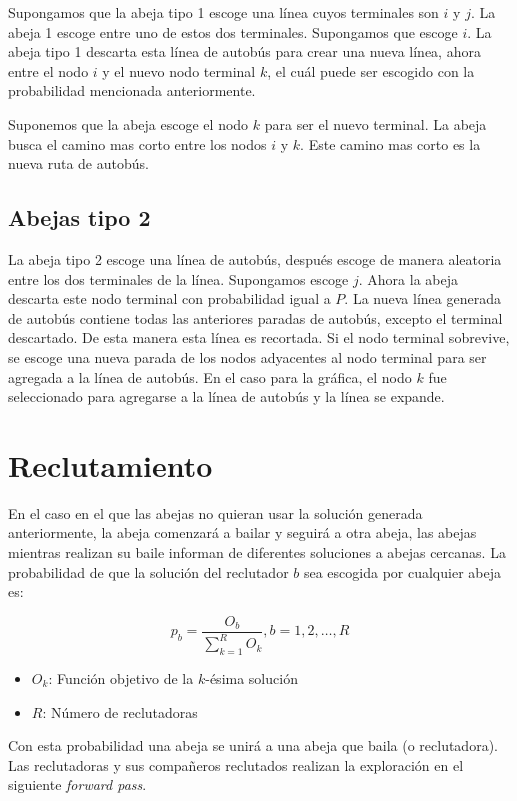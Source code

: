 \documentclass[letterpaper,12pt]{article}
\begin{document}
Supongamos que la abeja tipo 1 escoge una línea cuyos terminales son $i$ y $j$.
La abeja 1 escoge entre uno de estos dos terminales. Supongamos que escoge $i$. 
La abeja tipo 1 descarta esta línea de autobús para crear una nueva línea, 
ahora entre el nodo $i$ y el nuevo nodo terminal $k$, el cuál puede ser 
escogido con la probabilidad mencionada anteriormente.

Suponemos que la abeja escoge el nodo $k$ para ser el nuevo terminal. La abeja 
busca el camino mas corto entre los nodos $i$ y $k$. Este camino mas corto es
la nueva ruta de autobús.

\subsection{Abejas tipo 2}

La abeja tipo 2 escoge una línea de autobús, después escoge de manera 
aleatoria entre los dos terminales de la línea. Supongamos escoge $j$. 
Ahora la abeja descarta este nodo terminal con probabilidad igual a $P$. 
La nueva línea generada de autobús contiene todas las anteriores paradas 
de autobús, excepto el terminal descartado. De esta manera esta línea es 
recortada. Si el nodo terminal sobrevive, se escoge una nueva parada de los 
nodos adyacentes al nodo terminal para ser agregada a la línea de autobús. 
En el caso para la gráfica, el nodo $k$ fue seleccionado para agregarse a la 
línea de autobús y la línea se expande.

\section{Reclutamiento}

En el caso en el que las abejas no quieran usar la solución generada 
anteriormente, la abeja comenzará a bailar y seguirá a otra abeja, las abejas 
mientras realizan su baile informan de diferentes soluciones a abejas cercanas. 
La probabilidad de que la solución del reclutador $b$ sea escogida por cualquier 
abeja es:

$$ p_b = \frac{O_b}{\sum^{R}_{k=1} O_k}, b = 1, 2, \dots, R $$
\begin{itemize}
    \itemsep0em 
    \item $O_k$: Función objetivo de la $k$-ésima solución
    \item $R$: Número de reclutadoras
\end{itemize}

Con esta probabilidad una abeja se unirá a una abeja que baila (o reclutadora). 
Las reclutadoras y sus compañeros reclutados realizan la exploración en el 
siguiente \textit{forward pass}.
\end{document}
